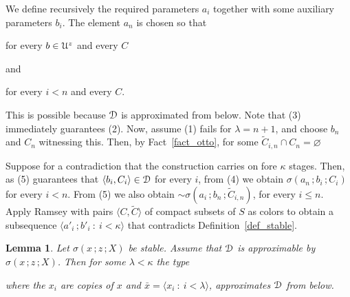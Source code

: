 \documentclass{amsproc}
\makeatletter
\newcounter{thm}
\theoremstyle{mio}
\newtheorem{lemma}[thm]{Lemma}\tcolorboxenvironment{lemma}{mythm}
\providecommand{\proofNameStyle}{\bfseries}
\renewenvironment{proof}[1][\proofname]{\par
  \pushQED{\qed}%
  \normalfont%
  \trivlist
  \item[\hskip\labelsep
        \proofNameStyle
    #1\@addpunct{.}]\ignorespaces
}{%
  \popQED\endtrivlist\@endpefalse
}
\makeatother
\begin{document}
\begin{proof}
  We define recursively the required parameters $a_i$ together with some auxiliary parameters $b_i$.
  The element $a_n$ is chosen so that

\hfill for every $b\in{\EuScript U}^z$ and every $C$

and

\hfill for every $i<n$ and every $C$.\smallskip

This is possible because ${\EuScript D}$ is approximated from below.
Note that (3) immediately guarantees (2).
Now, assume (1) fails for $\lambda=n+1$, and choose $b_n$ and $C_n$ witnessing this.
Then, by Fact~\ref{fact_otto}, for some $\tilde C_{i,n}\cap C_n=\varnothing$


Suppose for a contradiction that the construction carries on fore $\kappa$ stages.
Then, as (5) guarantees that $\langle b_i,C_i\rangle\in{\EuScript D}$ for every $i$, from (4) we obtain $\sigma(a_n\,;b_i\,;C_i)$ for every $i<n$.
From (5) we also obtain ${\sim}\sigma(a_i\,;b_n\,;\tilde C_{i,n})$, for every $i\le n$.
Apply Ramsey with pairs $\langle C,\tilde C\rangle$ of compact subsets of $S$ as colors to obtain a subsequence $\langle a'_i\,;b'_i\ :\ i<\kappa\rangle$ that contradicts Definition~\ref{def_stable}.
\end{proof}

\begin{lemma}
  Let $\sigma(x\,;z\,;X)$ be stable.
  Assume that ${\EuScript D}$ is approximable by $\sigma(x\,;z\,;X)$.
  Then for some $\lambda<\kappa$ the type\medskip 

  \smallskip
  
  where the $x_i$ are copies of $x$ and $\bar x=\langle x_i\ :\ i<\lambda\rangle$,
  approximates ${\EuScript D}$ from below.
\end{lemma}
\end{document}
